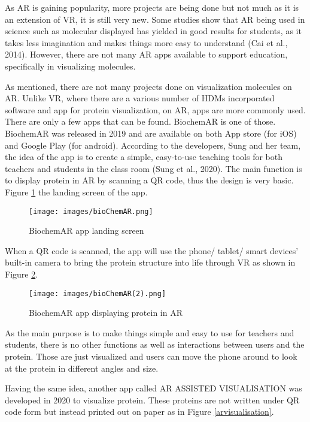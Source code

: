As AR is gaining popularity, more projects are being done but not much as it is an extension of VR, it is still very new. Some studies show that AR being used in science such as molecular displayed has yielded in good results for students, as it takes less imagination and makes things more easy to understand (Cai et al., 2014). However, there are not many AR apps available to support education, specifically in visualizing molecules. 

As mentioned, there are not many projects done on visualization molecules on AR. Unlike VR, where there are a various number of HDMs incorporated software and app for protein visualization, on AR, apps are more commonly used. There are only a few apps that can be found. BiochemAR is one of those. BiochemAR was released in 2019 and are available on both App store (for iOS) and Google Play (for android). According to the developers, Sung and her team, the idea of the app is to create a simple, easy-to-use teaching tools for both teachers and students in the class room (Sung et al., 2020). The main function is to display protein in AR by scanning a QR code, thus the design is very basic. Figure \ref{bioChemAR1} the landing screen of the app.

\begin{figure}[!htbp]
	\centering
	\texttt{[image: images/bioChemAR.png]}
	\caption{BiochemAR app landing screen}
	\label{bioChemAR1}
\end{figure}

When a QR code is scanned, the app will use the phone/ tablet/ smart devices’ built-in camera to bring the protein structure into life through VR as shown in Figure \ref{bioChemAR2}.

\begin{figure}[!htbp]
	\centering
	\texttt{[image: images/bioChemAR(2).png]}
	\caption{BiochemAR app displaying protein in AR}
	\label{bioChemAR2}
\end{figure}

As the main purpose is to make things simple and easy to use for teachers and students, there is no other functions as well as interactions between users and the protein. Those are just visualized and users can move the phone around to look at the protein in different angles and size. 

Having the same idea, another app called {\footnotesize AR ASSISTED VISUALISATION}
was developed in 2020 to visualize protein. These proteins are not written under QR code form but instead printed out on paper as in Figure \ref{arvisualisation}. 


